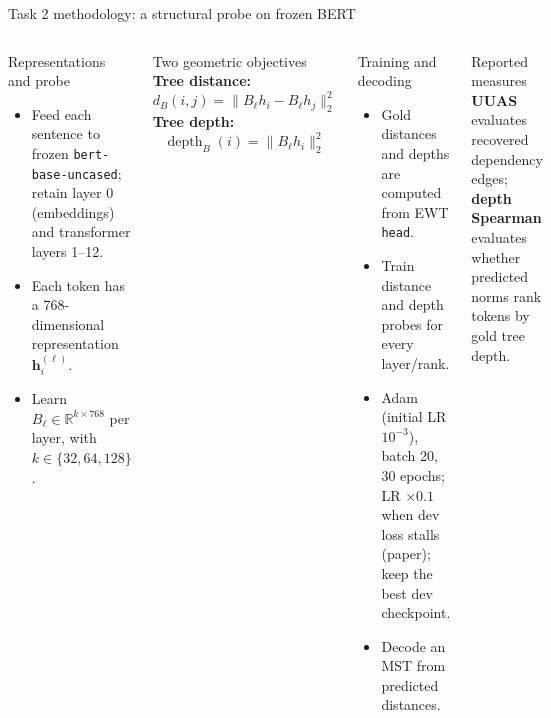 \documentclass[aspectratio=169,9pt]{beamer}
\newcommand{\tightitem}{\setlength{\itemsep}{0.14em}\setlength{\parskip}{0pt}}
\begin{document}
\begin{frame}{Task 2 methodology: a structural probe on frozen BERT}
\vspace{-0.1em}
\begin{columns}[T,onlytextwidth]
  \begin{block}{Representations and probe}
    \begin{itemize}\tightitem
      \item Feed each sentence to frozen \texttt{bert-base-uncased}; retain layer 0 (embeddings) and transformer layers 1--12.
      \item Each token has a 768-dimensional representation $\mathbf{h}^{(\ell)}_i$.
      \item Learn $B_\ell\in\mathbb{R}^{k\times768}$ per layer, with $k\in\{32,64,128\}$.
    \end{itemize}
  \end{block}
  \begin{block}{Two geometric objectives}
    \textbf{Tree distance:}
    \[
      d_B(i,j)=\|B_\ell h_i-B_\ell h_j\|_2^2
    \]
    \textbf{Tree depth:}
    \[
      \operatorname{depth}_B(i)=\|B_\ell h_i\|_2^2
    \]
  \end{block}
  \begin{block}{Training and decoding}
    \begin{itemize}\tightitem
      \item Gold distances and depths are computed from EWT \texttt{head}.
      \item Train distance and depth probes for every layer/rank.
      \item Adam (initial LR $10^{-3}$), batch 20, 30 epochs; LR $\times0.1$ when dev loss stalls (paper); keep the best dev checkpoint.
      \item Decode an MST from predicted distances.
    \end{itemize}
  \end{block}
  \begin{exampleblock}{Reported measures}
    \textbf{UUAS} evaluates recovered dependency edges; \textbf{depth Spearman} evaluates whether predicted norms rank tokens by gold tree depth.
  \end{exampleblock}
\end{columns}
\end{frame}
\end{document}

